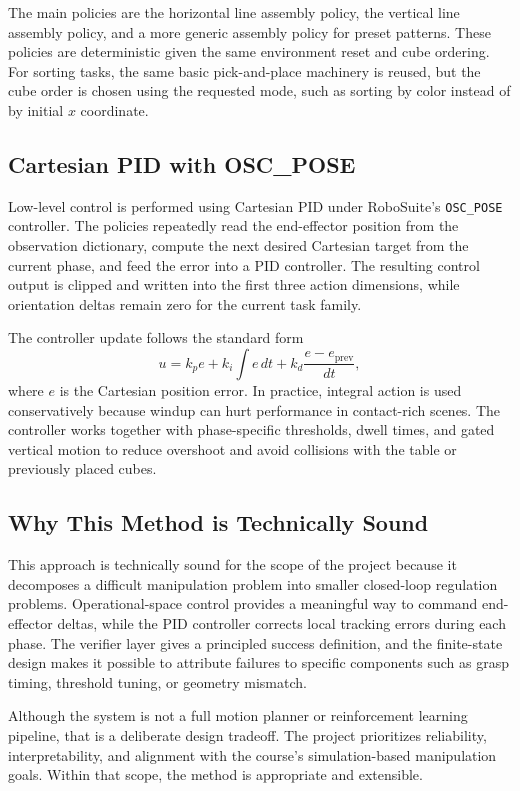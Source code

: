 \documentclass[10pt,letterpaper,twocolumn]{article}
\begin{document}
The main policies are the horizontal line assembly policy, the vertical line assembly policy, and a more generic assembly policy for preset patterns. These policies are deterministic given the same environment reset and cube ordering. For sorting tasks, the same basic pick-and-place machinery is reused, but the cube order is chosen using the requested mode, such as sorting by color instead of by initial $x$ coordinate.

\subsection{Cartesian PID with OSC\_POSE}
Low-level control is performed using Cartesian PID under RoboSuite's \texttt{OSC\_POSE} controller. The policies repeatedly read the end-effector position from the observation dictionary, compute the next desired Cartesian target from the current phase, and feed the error into a PID controller. The resulting control output is clipped and written into the first three action dimensions, while orientation deltas remain zero for the current task family.

The controller update follows the standard form
\begin{equation}
    u = k_p e + k_i \int e\,dt + k_d \frac{e - e_{\text{prev}}}{dt},
\end{equation}
where $e$ is the Cartesian position error. In practice, integral action is used conservatively because windup can hurt performance in contact-rich scenes. The controller works together with phase-specific thresholds, dwell times, and gated vertical motion to reduce overshoot and avoid collisions with the table or previously placed cubes.

\subsection{Why This Method is Technically Sound}
This approach is technically sound for the scope of the project because it decomposes a difficult manipulation problem into smaller closed-loop regulation problems. Operational-space control provides a meaningful way to command end-effector deltas, while the PID controller corrects local tracking errors during each phase. The verifier layer gives a principled success definition, and the finite-state design makes it possible to attribute failures to specific components such as grasp timing, threshold tuning, or geometry mismatch.

Although the system is not a full motion planner or reinforcement learning pipeline, that is a deliberate design tradeoff. The project prioritizes reliability, interpretability, and alignment with the course's simulation-based manipulation goals. Within that scope, the method is appropriate and extensible.
\end{document}
